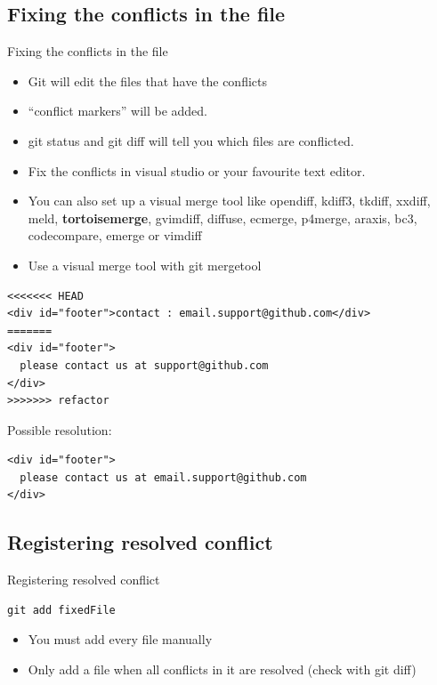 \documentclass[10pt,a4paper]{beamer}
\begin{document}
\subsection{Fixing the conflicts in the file}
\begin{frame}[fragile]{Fixing the conflicts in the file}
\begin{itemize}
\item Git will edit the files that have the conflicts
\item ``conflict markers'' will be added.
\item git status and git diff will tell you which files are conflicted.
\item Fix the conflicts in visual studio or your favourite text editor.
\item You can also set up a visual merge tool like opendiff, kdiff3, tkdiff, xxdiff, meld, \textbf{tortoisemerge}, gvimdiff, diffuse, ecmerge, p4merge, araxis, bc3, codecompare, emerge or vimdiff
\item Use a visual merge tool with git mergetool
\end{itemize}
\end{frame}

\begin{frame}[fragile]
\begin{verbatim}
<<<<<<< HEAD
<div id="footer">contact : email.support@github.com</div>
=======
<div id="footer">
  please contact us at support@github.com
</div>
>>>>>>> refactor
\end{verbatim}

Possible resolution:
\begin{verbatim}
<div id="footer">
  please contact us at email.support@github.com
</div>
\end{verbatim}
\end{frame}

\subsection{Registering resolved conflict}
\begin{frame}[fragile]{Registering resolved conflict}
\begin{verbatim}
git add fixedFile
\end{verbatim}
\begin{itemize}
\item You must add every file manually
\item Only add a file when all conflicts in it are resolved (check with git diff)

\end{itemize}
\end{frame}
\end{document}
